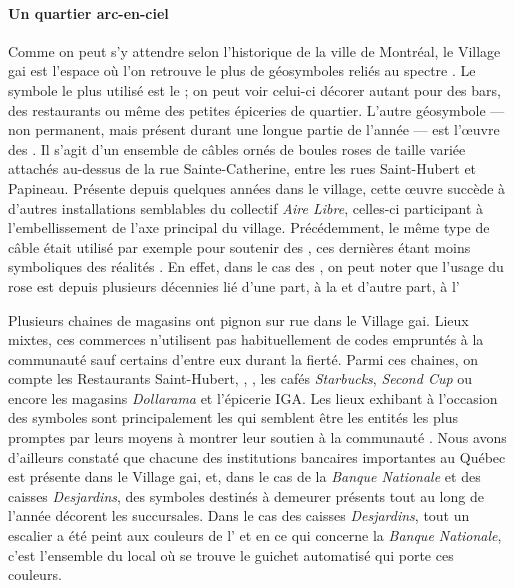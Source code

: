 \paragraph{Un quartier arc-en-ciel}
Comme on peut s'y attendre selon l'historique de la ville de Montréal, le Village gai est l'espace où l'on retrouve le plus de géosymboles reliés au spectre \lgbt{}.
Le symbole le plus utilisé est le  ; on peut voir celui-ci décorer autant pour des bars, des restaurants ou même des petites épiceries de quartier.
L'autre géosymbole --- non permanent, mais présent durant une longue partie de l'année --- est l'œuvre des .
Il s'agit d'un ensemble de câbles ornés de boules roses de taille variée attachés au-dessus de la rue Sainte-Catherine, entre les rues Saint-Hubert et Papineau.
Présente depuis quelques années dans le village, cette œuvre succède à d'autres installations semblables du collectif \emph{Aire Libre}, celles-ci participant à l'embellissement de l'axe principal du village.
Précédemment, le même type de câble était utilisé par exemple pour soutenir des , ces dernières étant moins symboliques des réalités \lgbt{}.
En effet, dans le cas des , on peut noter que l'usage du rose est depuis plusieurs décennies lié d'une part, à la  et d'autre part, à l'

Plusieurs chaines de magasins ont pignon sur rue dans le Village gai.
Lieux mixtes, ces commerces n'utilisent pas habituellement de codes empruntés à la communauté \lgbt{} sauf certains d'entre eux durant la fierté.
Parmi ces chaines, on compte les Restaurants Saint-Hubert, ,
, les cafés \emph{Starbucks}, \emph{Second Cup} ou encore les
magasins \emph{Dollarama} et l'épicerie IGA\@.
Les lieux exhibant à l'occasion des symboles sont principalement les  qui semblent être les entités les plus promptes par leurs moyens à montrer leur soutien à la communauté \lgbt.
Nous avons d'ailleurs constaté que chacune des institutions bancaires importantes au Québec est présente dans le Village gai, et, dans le cas de la \emph{Banque Nationale} et des caisses \emph{Desjardins}, des symboles \lgbt{} destinés à demeurer présents tout au long de l'année décorent les succursales.
Dans le cas des caisses \emph{Desjardins}, tout un escalier a été peint aux couleurs de l' et en ce qui concerne la \emph{Banque Nationale}, c'est l'ensemble du local où se trouve le guichet automatisé qui porte ces couleurs.


